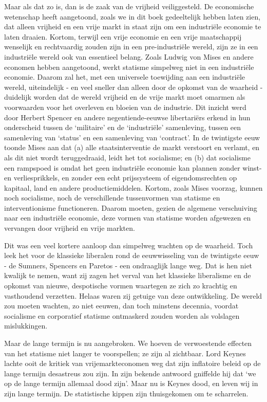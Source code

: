 \documentclass[
  a5paper,
  smalldemyvopaper,10pt,twoside,onecolumn,openright,extrafontsizes,hidelinks]{memoir}
\begin{document}
Maar als dat zo is, dan is de zaak van de vrijheid veiliggesteld. De
economische wetenschap heeft aangetoond, zoals we in dit boek
gedeeltelijk hebben laten zien, dat alleen vrijheid en een vrije markt
in staat zijn om een industriële economie te laten draaien. Kortom,
terwijl een vrije economie en een vrije maatschappij wenselijk en
rechtvaardig zouden zijn in een pre-industriële wereld, zijn ze in een
industriële wereld ook van essentieel belang. Zoals Ludwig von Mises en
andere economen hebben aangetoond, werkt statisme simpelweg niet in een
industriële economie. Daarom zal het, met een universele toewijding aan
een industriële wereld, uiteindelijk - en veel sneller dan alleen door
de opkomst van de waarheid - duidelijk worden dat de wereld vrijheid en
de vrije markt moet omarmen als voorwaarden voor het overleven en
bloeien van de industrie. Dit inzicht werd door Herbert Spencer en
andere negentiende-eeuwse libertariërs erkend in hun onderscheid tussen
de `militaire' en de `industriële' samenleving, tussen een samenleving
van `status' en een samenleving van `contract'. In de twintigste eeuw
toonde Mises aan dat (a) alle staatsinterventie de markt verstoort en
verlamt, en als dit niet wordt teruggedraaid, leidt het tot socialisme;
en (b) dat socialisme een rampspoed is omdat het geen industriële
economie kan plannen zonder winst- en verliesprikkels, en zonder een
echt prijssysteem of eigendomsrechten op kapitaal, land en andere
productiemiddelen. Kortom, zoals Mises voorzag, kunnen noch socialisme,
noch de verschillende tussenvormen van statisme en interventionisme
functioneren. Daarom moeten, gezien de algemene verschuiving naar een
industriële economie, deze vormen van statisme worden afgewezen en
vervangen door vrijheid en vrije markten.

Dit was een veel kortere aanloop dan simpelweg wachten op de waarheid.
Toch leek het voor de klassieke liberalen rond de eeuwwisseling van de
twintigste eeuw - de Sumners, Spencers en Paretos - een ondraaglijk
lange weg. Dat is hen niet kwalijk te nemen, want zij zagen het verval
van het klassieke liberalisme en de opkomst van nieuwe, despotische
vormen waartegen ze zich zo krachtig en vasthoudend verzetten. Helaas
waren zij getuige van deze ontwikkeling. De wereld zou moeten wachten,
zo niet eeuwen, dan toch minstens decennia, voordat socialisme en
corporatief statisme ontmaskerd zouden worden als volslagen
mislukkingen.

Maar de lange termijn is nu aangebroken. We hoeven de verwoestende
effecten van het statisme niet langer te voorspellen; ze zijn al
zichtbaar. Lord Keynes lachte ooit de kritiek van vrijemarkteconomen weg
dat zijn inflatoire beleid op de lange termijn desastreus zou zijn. In
zijn bekende antwoord gniffelde hij dat `we op de lange termijn allemaal
dood zijn'. Maar nu is Keynes dood, en leven wij in zijn lange termijn.
De statistische kippen zijn thuisgekomen om te scharrelen.
\end{document}
